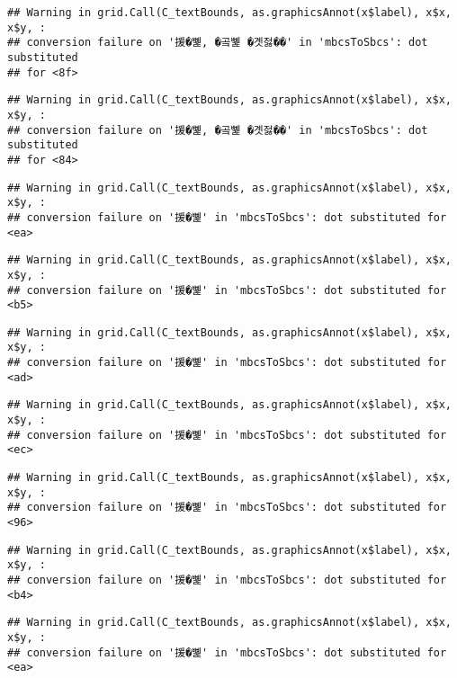 \documentclass[
]{article}
\begin{document}
\begin{verbatim}
## Warning in grid.Call(C_textBounds, as.graphicsAnnot(x$label), x$x, x$y, :
## conversion failure on '援�뼱, �곸뼱 �곗젏��' in 'mbcsToSbcs': dot substituted
## for <8f>
\end{verbatim}

\begin{verbatim}
## Warning in grid.Call(C_textBounds, as.graphicsAnnot(x$label), x$x, x$y, :
## conversion failure on '援�뼱, �곸뼱 �곗젏��' in 'mbcsToSbcs': dot substituted
## for <84>
\end{verbatim}

\begin{verbatim}
## Warning in grid.Call(C_textBounds, as.graphicsAnnot(x$label), x$x, x$y, :
## conversion failure on '援�뼱' in 'mbcsToSbcs': dot substituted for <ea>
\end{verbatim}

\begin{verbatim}
## Warning in grid.Call(C_textBounds, as.graphicsAnnot(x$label), x$x, x$y, :
## conversion failure on '援�뼱' in 'mbcsToSbcs': dot substituted for <b5>
\end{verbatim}

\begin{verbatim}
## Warning in grid.Call(C_textBounds, as.graphicsAnnot(x$label), x$x, x$y, :
## conversion failure on '援�뼱' in 'mbcsToSbcs': dot substituted for <ad>
\end{verbatim}

\begin{verbatim}
## Warning in grid.Call(C_textBounds, as.graphicsAnnot(x$label), x$x, x$y, :
## conversion failure on '援�뼱' in 'mbcsToSbcs': dot substituted for <ec>
\end{verbatim}

\begin{verbatim}
## Warning in grid.Call(C_textBounds, as.graphicsAnnot(x$label), x$x, x$y, :
## conversion failure on '援�뼱' in 'mbcsToSbcs': dot substituted for <96>
\end{verbatim}

\begin{verbatim}
## Warning in grid.Call(C_textBounds, as.graphicsAnnot(x$label), x$x, x$y, :
## conversion failure on '援�뼱' in 'mbcsToSbcs': dot substituted for <b4>
\end{verbatim}

\begin{verbatim}
## Warning in grid.Call(C_textBounds, as.graphicsAnnot(x$label), x$x, x$y, :
## conversion failure on '援�뼱' in 'mbcsToSbcs': dot substituted for <ea>
\end{verbatim}
\end{document}
